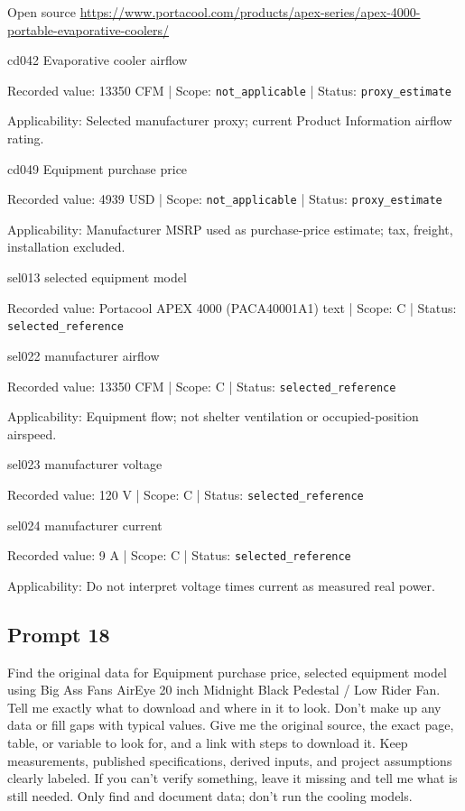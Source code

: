 Open source  \url{https://www.portacool.com/products/apex-series/apex-4000-portable-evaporative-coolers/}

cd042  Evaporative cooler airflow

Recorded value: 13350 CFM | Scope: \nolinkurl{not_applicable} | Status: \nolinkurl{proxy_estimate}

Applicability: Selected manufacturer proxy; current Product Information airflow rating.

cd049  Equipment purchase price

Recorded value: 4939 USD | Scope: \nolinkurl{not_applicable} | Status: \nolinkurl{proxy_estimate}

Applicability: Manufacturer MSRP used as purchase-price estimate; tax, freight, installation excluded.

sel013  selected equipment model

Recorded value: Portacool APEX 4000 (PACA40001A1) text | Scope: C | Status: \nolinkurl{selected_reference}

sel022  manufacturer airflow

Recorded value: 13350 CFM | Scope: C | Status: \nolinkurl{selected_reference}

Applicability: Equipment flow; not shelter ventilation or occupied-position airspeed.

sel023  manufacturer voltage

Recorded value: 120 V | Scope: C | Status: \nolinkurl{selected_reference}

sel024  manufacturer current

Recorded value: 9 A | Scope: C | Status: \nolinkurl{selected_reference}

Applicability: Do not interpret voltage times current as measured real power.

\subsection*{Prompt 18}
Find the original data for Equipment purchase price, selected equipment model using Big Ass Fans AirEye 20 inch Midnight Black Pedestal / Low Rider Fan. Tell me exactly what to download and where in it to look. Don’t make up any data or fill gaps with typical values. Give me the original source, the exact page, table, or variable to look for, and a link with steps to download it. Keep measurements, published specifications, derived inputs, and project assumptions clearly labeled. If you can’t verify something, leave it missing and tell me what is still needed. Only find and document data; don’t run the cooling models.

